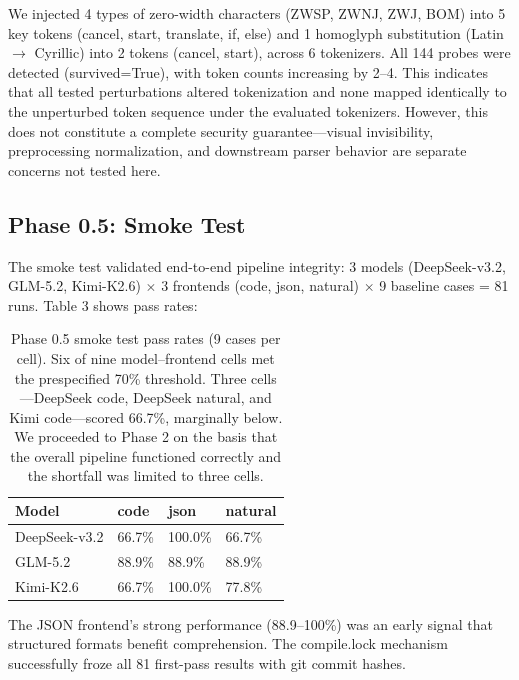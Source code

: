 \documentclass{article}
\begin{document}
We injected 4 types of zero-width characters (ZWSP, ZWNJ, ZWJ, BOM) into 5 key tokens (cancel, start, translate, if, else) and 1 homoglyph substitution (Latin $\to$ Cyrillic) into 2 tokens (cancel, start), across 6 tokenizers. All 144 probes were detected (survived=True), with token counts increasing by 2--4. This indicates that all tested perturbations altered tokenization and none mapped identically to the unperturbed token sequence under the evaluated tokenizers. However, this does not constitute a complete security guarantee---visual invisibility, preprocessing normalization, and downstream parser behavior are separate concerns not tested here.



\subsection{Phase 0.5: Smoke Test}\label{phase-0.5-smoke-test}



The smoke test validated end-to-end pipeline integrity: 3 models (DeepSeek-v3.2, GLM-5.2, Kimi-K2.6) $\times$ 3 frontends (code, json, natural) $\times$ 9 baseline cases = 81 runs. Table 3 shows pass rates:



\begin{table}[ht]
\centering
\small
\caption{Phase 0.5 smoke test pass rates (9 cases per cell). Six of nine model--frontend cells met the prespecified 70\% threshold. Three cells---DeepSeek code, DeepSeek natural, and Kimi code---scored 66.7\%, marginally below. We proceeded to Phase 2 on the basis that the overall pipeline functioned correctly and the shortfall was limited to three cells.}
\begin{tabular}{llll}
\toprule
Model & code & json & natural \\
\midrule
DeepSeek-v3.2 & 66.7\% & 100.0\% & 66.7\% \\
GLM-5.2 & 88.9\% & 88.9\% & 88.9\% \\
Kimi-K2.6 & 66.7\% & 100.0\% & 77.8\% \\
\bottomrule
\end{tabular}
\end{table}


The JSON frontend's strong performance (88.9--100\%) was an early signal that structured formats benefit comprehension. The compile.lock mechanism successfully froze all 81 first-pass results with git commit hashes.
\end{document}
